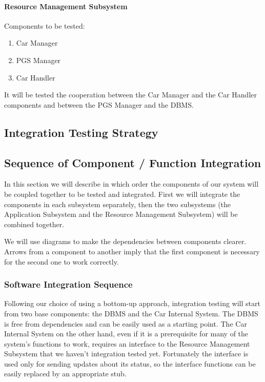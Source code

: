 \documentclass[english]{article}
\begin{document}
\paragraph{Resource Management Subsystem}
Components to be tested:
\begin{enumerate}
\item Car Manager
\item PGS Manager
\item Car Handler
\end{enumerate}

It will be tested the cooperation between the Car Manager and the Car Handler components and between the PGS Manager and the DBMS.



\subsection{Integration Testing Strategy}

\subsection{Sequence of Component / Function Integration}

In this section we will describe in which order the components of our system will be coupled together to be tested and integrated.
First we will integrate the components in each subsystem separately, then the two subsystems (the Application Subsystem and the Resource Management Subsystem) will be combined together.

We will use diagrams to make the dependencies between components clearer. Arrows from a component to another imply that the first component is necessary for the second one to work correctly.


\subsubsection{Software Integration Sequence}

Following our choice of using a bottom-up approach, integration testing will start from two base components: the DBMS and the Car Internal System.
The DBMS is free from dependencies and can be easily used as a starting point.
The Car Internal System on the other hand, even if it is a prerequisite for many of the system's functions to work, requires an interface to the Resource Management Subsystem that we haven't integration tested yet. Fortunately the interface is used only for sending updates about its status, so the interface functions can be easily replaced by an appropriate stub.
\end{document}
